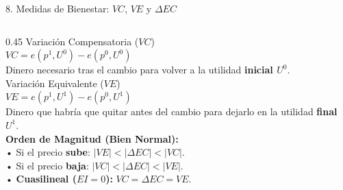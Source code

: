 \documentclass[aspectratio=169, 10pt]{beamer}
\begin{document}
\begin{frame}{8. Medidas de Bienestar: \(VC\), \(VE\) y \(\Delta EC\)}
\begin{columns}[T]
    \begin{column}{0.45\textwidth}
      {\scriptsize\color{grisTexto}Variación Compensatoria (\(VC\))}\\[1pt]
      {\normalsize\color{rojoAcento}\textbf{\(VC = e(p^1, U^0) - e(p^0, U^0)\)}}\\[2pt]
      {\scriptsize
        Dinero necesario tras el cambio para volver a la utilidad \textbf{inicial \(U^0\)}.\\[5pt]
      }
      {\scriptsize\color{grisTexto}Variación Equivalente (\(VE\))}\\[1pt]
      {\normalsize\color{verdeAcento}\textbf{\(VE = e(p^1, U^1) - e(p^0, U^1)\)}}\\[2pt]
      {\scriptsize
        Dinero que habría que quitar antes del cambio para dejarlo en la utilidad \textbf{final \(U^1\)}.\\[5pt]
      }
      {\scriptsize
        \textbf{Orden de Magnitud (Bien Normal):}\\
        • Si el precio \textbf{sube}: \(|VE| < |\Delta EC| < |VC|\).\\
        • Si el precio \textbf{baja}: \(|VC| < |\Delta EC| < |VE|\).\\
        • \textbf{Cuasilineal (\(EI=0\)):} \(VC = \Delta EC = VE\).
      }
    \end{column}
  \end{columns}

\end{frame}
\end{document}

